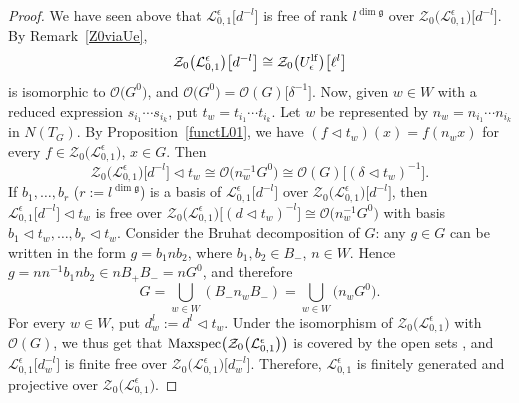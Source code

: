 \documentclass[pdftex]{sigma}
\numberwithin{equation}{section}
\theoremstyle{definition}
\newcommand{\e}{\epsilon}
\newcommand{\Ll}{{\mathcal L}}
\newcommand{\Oo}{{\mathcal O}}
\begin{document}
\begin{proof}
We have seen above that $\Ll_{0,1}^\e\big[d^{-l}\big]$ is free of rank $l^{\dim \mathfrak{g}}$ over $\mathcal{Z}_0\bigl(\Ll_{0,1}^\e\bigr)\big[d^{-l}\big]$. By Remark~\ref{Z0viaUe}, \[\mathcal{Z}_0\bigl(\Ll_{0,1}^\e\bigr)\big[d^{-l}\big]\cong \mathcal{Z}_0\big(U_\e^{\rm lf}\big)\big[\ell^l\big]\] is isomorphic to $\Oo\big(G^0\big)$, and $\Oo\big(G^0\big) = \Oo(G)\big[\delta^{-1}\big]$. Now, given $w\in W$ with a reduced expression $s_{i_1}\cdots s_{i_k}$, put $t_w = t_{i_1}\cdots t_{i_k}$. Let $w$ be represented by $n_w = n_{i_1}\cdots n_{i_k}$ in $N(T_G)$. By Proposition~\ref{functL01}, we have $(f\lhd t_w)(x) = f(n_wx)$ for every $f\in \mathcal{Z}_0\bigl(\Ll_{0,1}^\e\bigr)$, $x\in G$. Then
\begin{equation}\label{BruhatactionX}
\mathcal{Z}_0\bigl(\Ll_{0,1}^\e\bigr)\big[d^{-l}\big]\lhd t_w \cong \Oo\big(n_{w}^{-1}G^0\big) \cong \Oo(G)\big[(\delta\lhd t_w)^{-1}\big].
\end{equation}
If $b_1,\dots,b_r$ \big($r:= l^{\dim \mathfrak{g}}$\big) is a basis of $\Ll_{0,1}^\e\big[d^{-l}\big]$ over $\mathcal{Z}_0\bigl(\Ll_{0,1}^\e\bigr)\big[d^{-l}\big]$, then $\Ll_{0,1}^\e\big[d^{-l}\big]\lhd t_w$ is free over $\mathcal{Z}_0\bigl(\Ll_{0,1}^\e\bigr)\big[(d\lhd t_w)^{-l}\big]\cong \Oo\big(n_{w}^{-1}G^0\big)$ with basis $b_1\lhd t_w,\dots,b_r\lhd t_w$. Consider the Bruhat decomposition of $G$: any $g\in G$ can be written in the form $g=b_1n b_2$, where $b_1,b_2\in B_-$, $n\in W$. Hence $g = nn^{-1}b_1nb_2\in nB_+B_- = nG^0$, and therefore%
\[G = \bigcup_{w\in W} (B_- n_w B_- )= \bigcup_{w\in W} \big(n_w G^0\big).\]
For every $w\in W$, put $d^l_w := d^{l}\lhd t_w$.
Under the isomorphism of $\mathcal{Z}_0\bigl(\Ll_{0,1}^\e\bigr)$ with $\Oo(G)$, we thus get that ${\rm Maxspec}\bigl(\mathcal{Z}_0\bigl(\Ll_{0,1}^\e\bigr)\bigr)$ is covered by the open sets , and $\Ll_{0,1}^\e\big[d_w^{-l}\big]$ is finite free over $\mathcal{Z}_0\bigl(\Ll_{0,1}^\e\bigr)\big[d_w^{-l}\big]$. Therefore, $\Ll_{0,1}^\e$ is finitely generated and projective over $\mathcal{Z}_0\bigl(\Ll_{0,1}^\e\bigr)$.


\end{proof}
\end{document}
